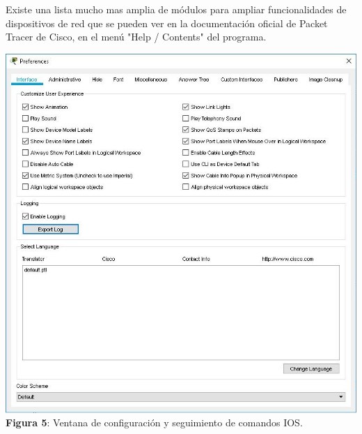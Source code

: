 \documentclass{article}
\begin{document}
    Existe una lista mucho mas amplia de módulos para ampliar funcionalidades de dispositivos de red que se pueden ver en la documentación oficial de Packet Tracer de Cisco, en el menú "Help / Contents" del programa.
    \begin{center}
        \includegraphics[width=0.55\linewidth]{img_9} 
        \linebreak
        \small {\bfseries Figura 5}: Ventana de configuración y seguimiento de comandos IOS.
    \end{center}
\end{document}
